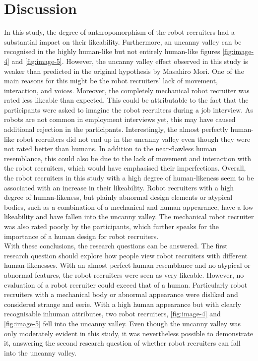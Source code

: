 \section{Discussion}
In this study, the degree of anthropomorphism of the robot recruiters had a substantial impact on their likeability. Furthermore, an uncanny valley can be recognised in the highly human-like but not entirely human-like figures \ref{fig:image-4} and \ref{fig:image-5}. However, the uncanny valley effect observed in this study is weaker than predicted in the original hypothesis by Masahiro Mori. One of the main reasons for this might be the robot recruiters' lack of movement, interaction, and voices. Moreover, the completely mechanical robot recruiter was rated less likeable than expected. This could be attributable to the fact that the participants were asked to imagine the robot recruiters during a job interview. As robots are not common in employment interviews yet, this may have caused additional rejection in the participants.
Interestingly, the almost perfectly human-like robot recruiters did not end up in the uncanny valley even though they were not rated better than humans. In addition to the near-flawless human resemblance, this could also be due to the lack of movement and interaction with the robot recruiters, which would have emphasised their imperfections. 
Overall, the robot recruiters in this study with a high degree of human-likeness seem to be associated with an increase in their likeability. Robot recruiters with a high degree of human-likeness, but plainly abnormal design elements or atypical bodies, such as a combination of a mechanical and human appearance, have a low likeability and have fallen into the uncanny valley.
The mechanical robot recruiter was also rated poorly by the participants, which further speaks for the importance of a human design for robot recruiters.\\
With these conclusions, the research questions can be answered.
The first research question should explore how people view robot recruiters with different human-likenesses. With an almost perfect human resemblance and no atypical or abnormal features, the robot recruiters were seen as very likeable. However, no evaluation of a robot recruiter could exceed that of a human. Particularly robot recruiters with a mechanical body or abnormal appearance were disliked and considered strange and eerie.
With a high human appearance but with clearly recognisable inhuman attributes, two robot recruiters, \ref{fig:image-4} and \ref{fig:image-5} fell into the uncanny valley. Even though the uncanny valley was only moderately evident in this study, it was nevertheless possible to demonstrate it, answering the second research question of whether robot recruiters can fall into the uncanny valley.

